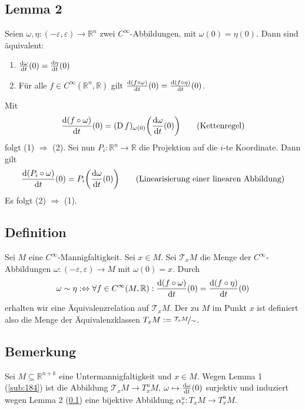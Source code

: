 \subsection[Lemma 2: Äquivalenz, die eine allgemeine Definition von Tangentialvektoren ermöglicht]{Lemma 2} %
\label{sub:185}
Seien $\omega, \eta : (-\varepsilon, \varepsilon) \to \mathds{R}^n$ zwei $C^\infty$-Abbildungen, mit $\omega(0)= \eta(0)$. Dann sind äquivalent:
\begin{enumerate}[(1)]
	\item $\frac{\mathrm{d} \omega}{\mathrm{d} t} (0)= \frac{\mathrm{d} \eta}{\mathrm{d} t} (0)$
	\item Für alle $f \in C^\infty(\mathds{R}^n,\mathds{R})$ gilt $\frac{\mathrm{d} (f \circ \omega)}{\mathrm{d} t} (0) = \frac{\mathrm{d} (f \circ \eta)}{\mathrm{d} t} (0)$.
\end{enumerate}
Mit
\begin{align*}
	\diffd{(f \circ \omega)}{t}(0) = (\D f)_{\omega(0)}\enbrace*{\diffd{\omega}{t}(0)}  \tag*{(Kettenregel)}
\end{align*}
folgt (1) $\Rightarrow $ (2). Sei nun $P_i : \mathds{R}^n \to \mathds{R}$ die Projektion auf die $i$-te Koordinate. Dann gilt
\begin{align*}
	\diffd{(P_i \circ \omega)}{t}(0) = P_i \enbrace*{\diffd{\omega}{t}(0)} \tag*{(Linearisierung einer linearen Abbildung)}
\end{align*}
Es folgt (2) $\Rightarrow $ (1). \bewende

\subsection[Definition: Tangentialraum]{Definition} %
\label{sub:186}
Sei $M$ eine $C^\infty$-Mannigfaltigkeit. Sei $x \in M$. Sei $\mathcal{T}_x M$ die Menge der $C^\infty$-Abbildungen $\omega : (-\varepsilon,\varepsilon) \to M$ mit 
$\omega(0)=x$. Durch
\[
	\omega \sim \eta :\Leftrightarrow \forall f \in C^\infty(M,\mathbb{R}) : \frac{\mathrm{d} (f \circ \omega)}{\mathrm{d} t} (0) = \frac{\mathrm{d} (f \circ \eta)}{\mathrm{d} t} (0)
\]
erhalten wir eine Äquivalenzrelation auf $\mathcal{T}_xM$. Der  zu $M$ im Punkt $x$ ist definiert also die Menge der Äquivalenzklassen 
$T_x M := \nicefrac{\mathcal{T}_x M}{\sim}$.

\subsection{Bemerkung} %
\label{sub:187}
Sei $M \subseteq \mathds{R}^{n+k}$ eine Untermannigfaltigkeit und $x \in M$. Wegen Lemma 1 (\ref{sub:184}) ist die Abbildung $\mathcal{T}_x M  \to T^u_x M$, 
$\omega \mapsto \frac{\mathrm{d} \omega}{\mathrm{d} t} (0)$ surjektiv und induziert wegen Lemma 2 (\ref{sub:185}) eine bijektive Abbildung $\alpha_x^u : T_x M \to T_x^u M$.

